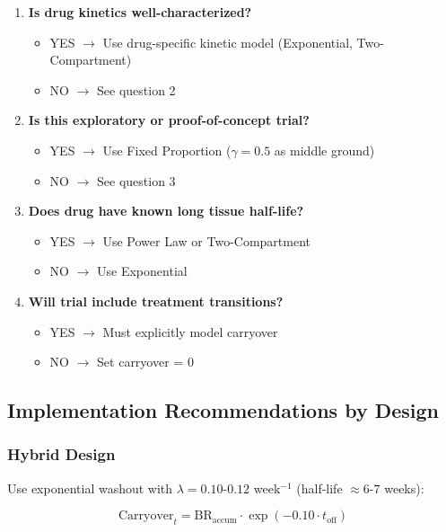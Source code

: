 \documentclass[11pt,a4paper]{article}
\begin{document}
\begin{enumerate}
  \item \textbf{Is drug kinetics well-characterized?}
    \begin{itemize}
      \item YES $\rightarrow$ Use drug-specific kinetic model (Exponential, Two-Compartment)
      \item NO $\rightarrow$ See question 2
    \end{itemize}

  \item \textbf{Is this exploratory or proof-of-concept trial?}
    \begin{itemize}
      \item YES $\rightarrow$ Use Fixed Proportion ($\gamma = 0.5$ as middle ground)
      \item NO $\rightarrow$ See question 3
    \end{itemize}

  \item \textbf{Does drug have known long tissue half-life?}
    \begin{itemize}
      \item YES $\rightarrow$ Use Power Law or Two-Compartment
      \item NO $\rightarrow$ Use Exponential
    \end{itemize}

  \item \textbf{Will trial include treatment transitions?}
    \begin{itemize}
      \item YES $\rightarrow$ Must explicitly model carryover
      \item NO $\rightarrow$ Set carryover = 0
    \end{itemize}
\end{enumerate}

\subsection{Implementation Recommendations by Design}

\subsubsection{Hybrid Design}

Use exponential washout with $\lambda = 0.10$-$0.12$ week$^{-1}$ (half-life $\approx 6$-$7$ weeks):

\begin{equation}
  \text{Carryover}_t = \text{BR}_{\text{accum}} \cdot \exp(-0.10 \cdot t_{\text{off}})
\end{equation}
\end{document}
